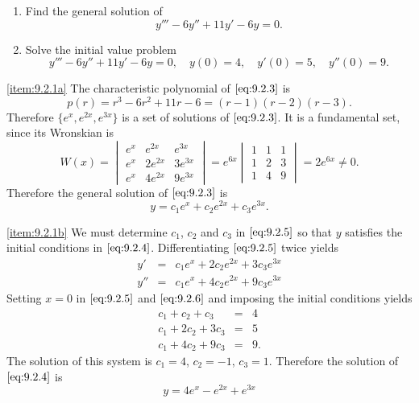 \documentclass{ximera}
\begin{document}
\begin{example}\label{example:9.2.1} 
\begin{enumerate}
\item\label{item:9.2.1a} %
Find the general solution of
\begin{equation} \label{eq:9.2.3}
y'''-6y''+11y'-6y=0.
\end{equation}
\item\label{item:9.2.1b} %
Solve the initial value problem
\begin{equation} \label{eq:9.2.4}
y'''-6y''+11y'-6y=0, \quad  y(0)=4,\quad y'(0)=5,\quad y''(0)=9.
\end{equation}
\end{enumerate}


\begin{explanation} \ref{item:9.2.1a} The characteristic polynomial of
$\eqref{eq:9.2.3}$ is
$$
p(r)=r^3-6r^2+11r-6=(r-1)(r-2)(r-3).
$$
Therefore $\{e^x,e^{2x},e^{3x}\}$ is a set of solutions of
$\eqref{eq:9.2.3}$. It is a fundamental set, since its Wronskian is
$$
W(x)=\begin{vmatrix}e^x&e^{2x}&e^{3x}\\e^x&2e^{2x}&
3e^{3x}\\e^x&4e^{2x}&9e^{3x}\end{vmatrix}=
e^{6x}\begin{vmatrix}1&1&1\\1&2&
3\\1&4&9\end{vmatrix}=2e^{6x}\neq 0.
$$
Therefore the general solution of $\eqref{eq:9.2.3}$ is
\begin{equation} \label{eq:9.2.5}
y=c_1e^{x}+c_2e^{2x}+c_3e^{3x}.
\end{equation}

\ref{item:9.2.1b} We must determine $c_1$, $c_2$ and $c_3$ in $\eqref{eq:9.2.5}$
so that $y$ satisfies the initial conditions in $\eqref{eq:9.2.4}$.
Differentiating $\eqref{eq:9.2.5}$ twice yields
\begin{equation} \label{eq:9.2.6}
\begin{array}{rcl}
y'&=&c_1e^{x}+2c_2e^{2x}+3c_3e^{3x}\\
y''&=&c_1e^{x}+4c_2e^{2x}+9c_3e^{3x}
\end{array}
\end{equation}
Setting $x=0$ in $\eqref{eq:9.2.5}$ and $\eqref{eq:9.2.6}$ and imposing the
initial conditions yields
$$\begin{array}{rcl}
c_1+c_2+c_3&=&4\\
c_1+2c_2+3c_3&=&5\\
c_1+4c_2+9c_3&=&9.
\end{array}$$
The solution of this system is $c_1=4$, $c_2=-1$, $c_3=1$. Therefore the
solution of $\eqref{eq:9.2.4}$ is
$$
y=4e^x-e^{2x}+e^{3x}
$$


\end{explanation}
\end{example}
\end{document}
